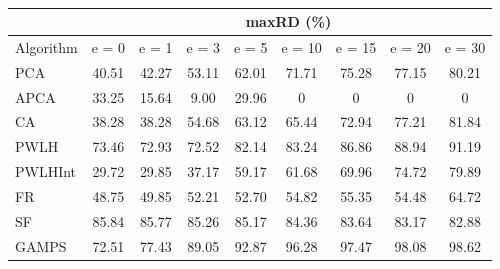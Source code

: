 \begin{table}[h]
\newcommand{\cpca}{\cellcolor{cyan!20}}
\newcommand{\capca}{\cellcolor{green!20}}
\newcommand{\cfr}{\cellcolor{yellow!25}}
\newcommand{\cgzip}{\cellcolor{orange!20}}
\newcommand{\best}{\cellcolor{gray!30}}
\centering\hspace*{0cm}\begin{tabular}{| l | c | c | c | c | c | c | c | c |}\cline{2-9}\multicolumn{1}{c|}{}& \multicolumn{8}{c|}{maxRD (\%)}\\\hline
{Algorithm} & {e = 0} & {e = 1} & {e = 3} & {e = 5} & {e = 10} & {e = 15} & {e = 20} & {e = 30} \\\hline
{PCA\cpca} & {40.51} & {42.27} & {53.11} & {62.01} & {71.71} & {75.28} & {77.15} & {80.21} \\\hline
{APCA\capca} & {33.25} & {\best15.64} & {\best9.00} & {\best29.96} & {\best0} & {\best0} & {\best0} & {\best0} \\\hline
{CA} & {38.28} & {38.28} & {54.68} & {63.12} & {65.44} & {72.94} & {77.21} & {81.84} \\\hline
{PWLH} & {73.46} & {72.93} & {72.52} & {82.14} & {83.24} & {86.86} & {88.94} & {91.19} \\\hline
{PWLHInt} & {\best29.72} & {29.85} & {37.17} & {59.17} & {61.68} & {69.96} & {74.72} & {79.89} \\\hline
{FR\cfr} & {48.75} & {49.85} & {52.21} & {52.70} & {54.82} & {55.35} & {54.48} & {64.72} \\\hline
{SF} & {85.84} & {85.77} & {85.26} & {85.17} & {84.36} & {83.64} & {83.17} & {82.88} \\\hline
{GAMPS} & {72.51} & {77.43} & {89.05} & {92.87} & {96.28} & {97.47} & {98.08} & {98.62} \\\hline
\end{tabular}
\caption{\captionminmaxone}
\label{experiments:minmaxone}
\end{table}
